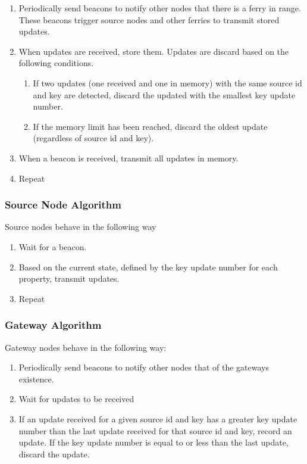 \begin{enumerate}
\item Periodically send beacons to notify other nodes that there is a ferry in range.
These beacons trigger source nodes and other ferries to transmit stored updates.
\item When updates are received, store them.
Updates are discard based on the following conditions.
	\begin{enumerate}
	\item If two updates (one received and one in memory) with the same source id and key are detected, discard the updated with the smallest key update number.
	\item If the memory limit has been reached, discard the oldest update (regardless of source id and key).
	\end{enumerate}
\item When a beacon is received, transmit all updates in memory.
\item Repeat
\end{enumerate}

\subsubsection{Source Node Algorithm}

Source nodes behave in the following way

\begin{enumerate}
\item Wait for a beacon.
\item Based on the current state, defined by the key update number for each property, transmit updates.
\item Repeat
\end{enumerate}

\subsubsection{Gateway Algorithm}

Gateway nodes behave in the following way:

\begin{enumerate}
\item Periodically send beacons to notify other nodes that of the gateways existence.
\item Wait for updates to be received
\item If an update received for a given source id and key has a greater key update number than the last update received for that source id and key, record an update.
If the key update number is equal to or less than the last update, discard the update.
\end{enumerate}

